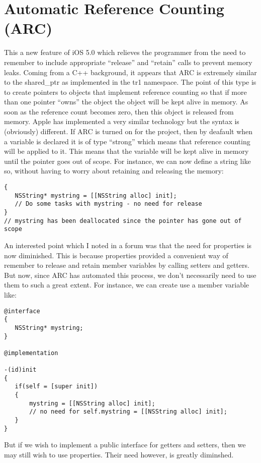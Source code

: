 \section{Automatic Reference Counting (ARC)}
\label{sec:autom-refer-count}

This a new feature of iOS 5.0 which relieves the programmer from the
need to remember to include appropriate ``release'' and ``retain''
calls to prevent memory leaks. Coming from a C++ background, it
appears that ARC is extremely similar to the shared\_ptr as implemented
in the tr1 namespace. The point of this type is to create pointers to
objects that implement reference counting so that if more than one
pointer ``owns'' the object the object will be kept alive in
memory. As soon as the reference count becomes zero, then this object
is released from memory. Apple has implemented a very similar technology but the syntax is
(obviously) different. If ARC is turned on for the project, then by
deafault when a variable is declared it is of type ``strong'' which
means that reference counting will be applied to it. This means that
the variable will be kept alive in memory until the pointer goes out
of scope. For instance, we can now define a string like so, without
having to worry about retaining and releasing the memory:
\begin{verbatim}
{
   NSString* mystring = [[NSString alloc] init];
   // Do some tasks with mystring - no need for release
}
// mystring has been deallocated since the pointer has gone out of scope
\end{verbatim}

An interested point which I noted in a forum was that the need for
properties is now diminished. This is because properties provided a
convenient way of remember to release and retain member variables by
calling setters and getters. But now, since ARC has automated this
process, we don't necessarily need to use them to such a great
extent. For instance, we can create use a member variable like:
\begin{verbatim}
@interface
{
   NSString* mystring;
}

@implementation

-(id)init
{
   if(self = [super init])
   {
       mystring = [[NSString alloc] init];
       // no need for self.mystring = [[NSString alloc] init];
   }   
}
\end{verbatim}

But if we wish to implement a public interface for getters and
setters, then we may still wish to use properties. Their need however,
is greatly diminshed.

